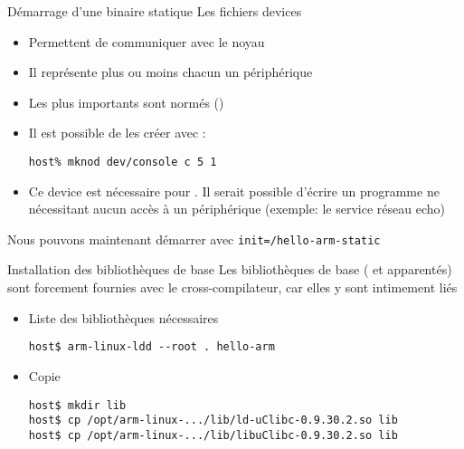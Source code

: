\begin{frame}[fragile=singleslide]{Démarrage d'une binaire statique}
  Les fichiers devices
  \begin{itemize}
  \item Permettent de communiquer avec le noyau
  \item Il représente plus ou moins chacun un périphérique
  \item Les plus importants sont normés ()
  \item Il est possible de les créer avec :
    \begin{lstlisting}
host% mknod dev/console c 5 1
    \end{lstlisting}
  \item  Ce  device  est  nécessaire  pour  .   Il  serait
    possible  d'écrire un programme  ne nécessitant  aucun accès  à un
    périphérique (exemple: le service réseau echo)
  \end{itemize}
  Nous pouvons maintenant démarrer avec \verb+init=/hello-arm-static+
\end{frame}

\begin{frame}[fragile=singleslide]{Installation des bibliothèques de base}
  Les bibliothèques de base  ( et apparentés) sont forcement
  fournies avec le cross-compilateur, car elles y sont intimement liés
  \begin{itemize}
  \item Liste des bibliothèques nécessaires
    \begin{lstlisting}
host$ arm-linux-ldd --root . hello-arm
    \end{lstlisting}
    \item Copie
    \begin{lstlisting}
host$ mkdir lib
host$ cp /opt/arm-linux-.../lib/ld-uClibc-0.9.30.2.so lib
host$ cp /opt/arm-linux-.../lib/libuClibc-0.9.30.2.so lib
    \end{lstlisting}
  \end{itemize}
\end{frame}  

